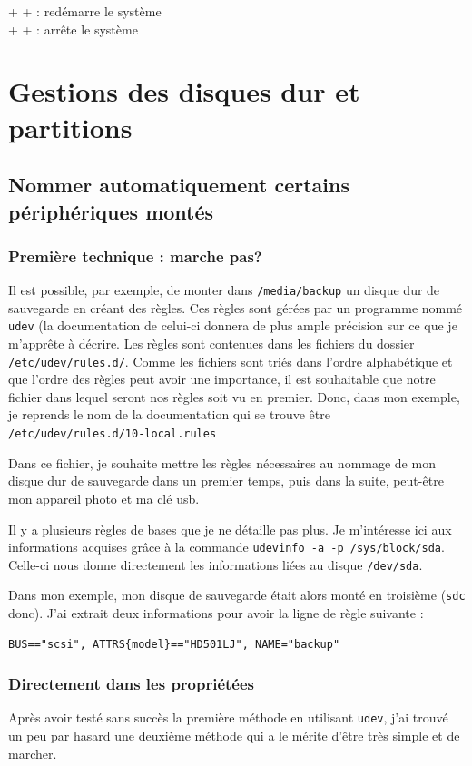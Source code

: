 \documentclass[a4paper,twoside]{article}
\begin{document}
 +  +  : redémarre le système\\
 +  +  : arrête le système

\section{Gestions des disques dur et partitions}
\subsection{Nommer automatiquement certains périphériques montés}
\subsubsection{Première technique : marche pas?}
Il est possible, par exemple, de monter dans \texttt{/media/backup} un disque dur de sauvegarde en créant des règles. Ces règles sont gérées par un programme nommé \texttt{udev} (la documentation de celui-ci donnera de plus ample précision sur ce que je m'apprête à décrire. Les règles sont contenues dans les fichiers du dossier \texttt{/etc/udev/rules.d/}. Comme les fichiers sont triés dans l'ordre alphabétique et que l'ordre des règles peut avoir une importance, il est souhaitable que notre fichier dans lequel seront nos règles soit vu en premier. Donc, dans mon exemple, je reprends le nom de la documentation qui se trouve être \texttt{/etc/udev/rules.d/10-local.rules}

Dans ce fichier, je souhaite mettre les règles nécessaires au nommage de mon disque dur de sauvegarde dans un premier temps, puis dans la suite, peut-être mon appareil photo et ma clé usb.

Il y a plusieurs règles de bases que je ne détaille pas plus. Je m'intéresse ici aux informations acquises grâce à la commande \verb|udevinfo -a -p /sys/block/sda|. Celle-ci nous donne directement les informations liées au disque \texttt{/dev/sda}.

Dans mon exemple, mon disque de sauvegarde était alors monté en troisième (\texttt{sdc} donc). J'ai extrait deux informations pour avoir la ligne de règle suivante :
\begin{verbatim}
BUS=="scsi", ATTRS{model}=="HD501LJ", NAME="backup"
\end{verbatim}
\subsubsection{Directement dans les propriétées}
Après avoir testé sans succès la première méthode en utilisant \texttt{udev}, j'ai trouvé un peu par hasard une deuxième méthode qui a le mérite d'être très simple et de marcher.
\end{document}
